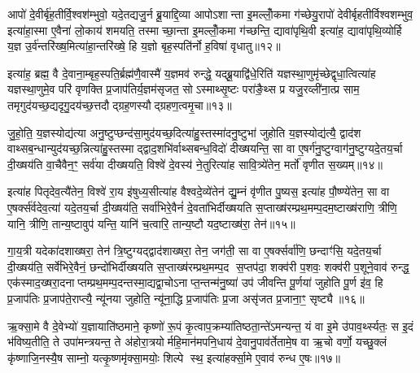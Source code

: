 आपो॑ दे॒वीर्बृ॑ह॒तीर्वि॒श्वश॑म्भुवो॒ यदे॒तद्यजु॒र्न ब्रू॒याद्दि॒व्या आपोऽशान्ता इ॒मल्लोँ॒कमा ग॑च्छेयु॒रापो॑ देवीर्बृहतीर्विश्वशम्भुव॒ इत्या॑हा॒स्मा ए॒वैना॑ लो॒काय॑ शमयति॒ तस्माच्छा॒न्ता इ॒मल्लोँ॒कमा ग॑च्छन्ति॒ द्यावा॑पृथि॒वी इत्या॑ह॒ द्यावा॑पृथि॒व्योर्\mbox{}हि य॒ज्ञ उ॒र्व॑न्तरि॑ख्ष॒मित्या॑हा॒न्तरि॑ख्षे॒ हि य॒ज्ञो बृह॒स्पति॑र्नो ह॒विषा॑ वृधातु॥१२॥

इत्या॑ह॒ ब्रह्म॒ वै दे॒वाना॒म्बृह॒स्पति॒र्ब्रह्म॑णै॒वास्मै॑ य॒ज्ञमव॑ रुन्द्धे॒ यद्ब्रू॒याद्वि॑धे॒रिति॑ यज्ञस्था॒णुमृ॑च्छेद्वृधा॒त्वित्या॑ह यज्ञस्था॒णुमे॒व परि॑ वृणक्ति प्र॒जाप॑तिर्य॒ज्ञम॑सृजत॒ सोऽस्माथ्सृ॒ष्टः परा॑ङै॒थ्स प्र यजु॒रव्ली॑ना॒त्प्र साम॒ तमृगुद॑यच्छ॒द्यदृगु॒दय॑च्छ॒त्तदौद्ग्रह॒णस्यौद्ग्रहण॒त्वमृ॒चा॥१३॥

जु॒हो॒ति॒ य॒ज्ञस्योद्य॑त्या अनु॒ष्टुप्छन्द॑सा॒मुद॑यच्छ॒दित्या॑हु॒स्तस्मा॑दनु॒ष्टुभा॑ जुहोति य॒ज्ञस्योद्य॑त्यै॒ द्वाद॑श वाथ्सब॒न्धान्युद॑यच्छ॒न्नित्या॑हु॒स्तस्माद्द्वाद॒शभि॑र्वाथ्सबन्ध॒विदो॑ दीख्षयन्ति॒ सा वा ए॒षर्ग॑नु॒ष्टुग्वाग॑नु॒ष्टुग्यदे॒तय॒र्चा दी॒ख्षय॑ति वा॒चैवैन॒ꣳ॒ सर्व॑या दीख्षयति॒ विश्वे॑ दे॒वस्य॑ ने॒तुरित्या॑ह सावि॒त्र्ये॑तेन॒ मर्तो॑ वृणीत स॒ख्यम्॥१४॥

इत्या॑ह पितृदेव॒त्यै॑तेन॒ विश्वे॑ रा॒य इ॑षुध्य॒सीत्या॑ह वैश्वदे॒व्ये॑तेन॑ द्यु॒म्नं वृ॑णीत पु॒ष्यस॒ इत्या॑ह पौ॒ष्ण्ये॑तेन॒ सा वा ए॒षर्क्स॑र्वदेव॒त्या॑ यदे॒तय॒र्चा दी॒ख्षय॑ति॒ सर्वा॑भिरे॒वैनं॑ दे॒वता॑भिर्दीख्षयति स॒प्ताख्ष॑रम्प्रथ॒मम्प॒दम॒ष्टाख्ष॑राणि॒ त्रीणि॒ यानि॒ त्रीणि॒ तान्य॒ष्टावुप॑ यन्ति॒ यानि॑ च॒त्वारि॒ तान्य॒ष्टौ यद॒ष्टाख्ष॑रा॒ तेन॑॥१५॥

गा॒य॒त्री यदेका॑दशाख्षरा॒ तेन॑ त्रि॒ष्टुग्यद्द्वाद॑शाख्षरा॒ तेन॒ जग॑ती॒ सा वा ए॒षर्क्सर्वा॑णि॒ छन्दाꣳ॑सि॒ यदे॒तय॒र्चा दी॒ख्षय॑ति॒ सर्वे॑भिरे॒वैनं॒ छन्दो॑भिर्दीख्षयति स॒प्ताख्ष॑रम्प्रथ॒मम्प॒द स॒प्तप॑दा॒ शक्व॑री प॒शवः॒ शक्व॑री प॒शूने॒वाव॑ रुन्द्ध॒ एक॑स्माद॒ख्षरा॒दनाप्तम्प्रथ॒मम्प॒दन्तस्मा॒द्यद्वा॒चोऽनाप्त॒न्तन्म॑नु॒ष्या॑ उप॑ जीवन्ति पू॒र्णया॑ जुहोति पू॒र्ण इ॑व॒ हि प्र॒जाप॑तिः प्र॒जाप॑ते॒राप्त्यै॒ न्यू॑नया जुहोति॒ न्यू॑ना॒द्धि प्र॒जाप॑तिः प्र॒जा असृ॑जत प्र॒जाना॒ꣳ॒ सृष्ट्यै॥१६॥

{\anuvakamend[{अ॒ग्नये॒ ता वृ॑धात्वृ॒चा स॒ख्यन्तेन॑ जुहोति॒ पञ्च॑दश च॥२॥}]}

ऋ॒क्सा॒मे वै दे॒वेभ्यो॑ य॒ज्ञायाति॑ष्ठमाने॒ कृष्णो॑ रू॒पं कृ॒त्वाप॒क्रम्या॑तिष्ठता॒न्ते॑ऽमन्यन्त॒ यं वा इ॒मे उ॑पाव॒र्थ्स्यतः॒ स इ॒दं भ॑विष्य॒तीति॒ ते उपा॑मन्त्रयन्त॒ ते अ॑होरा॒त्रयोर्महि॒मान॑मपनि॒धाय॑ दे॒वानु॒पाव॑र्तेतामे॒ष वा ऋ॒चो वर्णो॒ यच्छु॒क्लं कृ॑ष्णाजि॒नस्यै॒ष साम्नो॒ यत्कृ॒ष्णमृ॑क्सा॒मयोः॒ शिल्पे स्थ॒ इत्या॑हर्क्सा॒मे ए॒वाव॑ रुन्ध ए॒षः॥१७॥

